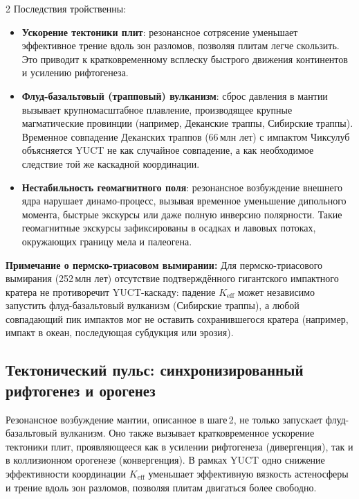 \documentclass[11pt,a4paper]{article}
\begin{document}
\begin{multicols}{2}
		Последствия тройственны:
		\begin{itemize}
			\item \textbf{Ускорение тектоники плит}: резонансное сотрясение
			уменьшает эффективное трение вдоль зон разломов, позволяя плитам
			легче скользить. Это приводит к кратковременному всплеску быстрого движения континентов и усилению рифтогенеза.
			\item \textbf{Флуд-базальтовый (трапповый) вулканизм}: сброс давления
			в мантии вызывает крупномасштабное плавление, производящее крупные магматические провинции
			(например, Деканские траппы, Сибирские траппы). Временное совпадение Деканских траппов (66 млн лет) с импактом Чиксулуб объясняется YUCT не как случайное совпадение, а как необходимое следствие той же каскадной координации.
			\item \textbf{Нестабильность геомагнитного поля}: резонансное возбуждение
			внешнего ядра нарушает динамо-процесс, вызывая временное
			уменьшение дипольного момента, быстрые экскурсы или даже полную
			инверсию полярности. Такие геомагнитные экскурсы зафиксированы в
			осадках и лавовых потоках, окружающих границу мела и палеогена.
		\end{itemize}
		
		\noindent
		\textbf{Примечание о пермско-триасовом вымирании:}
		Для пермско-триасового вымирания (252 млн лет) отсутствие подтверждённого
		гигантского импактного кратера не противоречит YUCT-каскаду: падение
		\(K_{\mathrm{eff}}\) может независимо запустить флуд-базальтовый вулканизм (Сибирские траппы), а любой совпадающий пик импактов мог не оставить сохранившегося кратера (например, импакт в океан, последующая субдукция или эрозия).
		
		\subsection{Тектонический пульс: синхронизированный рифтогенез и орогенез}
		
		Резонансное возбуждение мантии, описанное в шаге 2, не только запускает флуд-базальтовый вулканизм.
		Оно также вызывает кратковременное ускорение тектоники плит, проявляющееся как в усилении рифтогенеза
		(дивергенция), так и в коллизионном орогенезе (конвергенция). В рамках YUCT одно снижение
		эффективности координации \(K_{\mathrm{eff}}\) уменьшает эффективную вязкость астеносферы и
		трение вдоль зон разломов, позволяя плитам двигаться более свободно.
		

\end{multicols}
\end{document}
